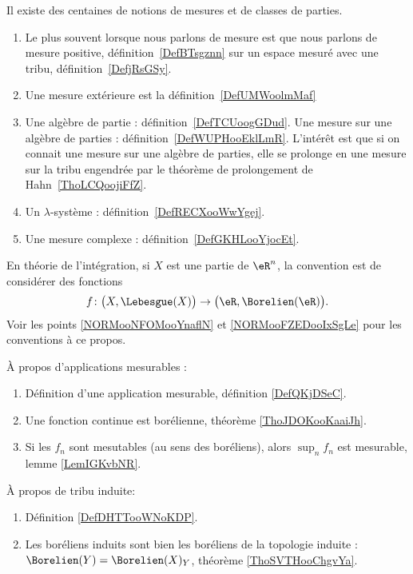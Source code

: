 

  \label{INTooVDSCooHXLLKp}
Il existe des centaines de notions de mesures et de classes de parties.
\begin{enumerate}
	\item
	      Le plus souvent lorsque nous parlons de mesure est que nous parlons de mesure positive, définition~\ref{DefBTsgznn} sur un espace mesuré avec une tribu, définition~\ref{DefjRsGSy}.
	\item
	      Une mesure extérieure est la définition~\ref{DefUMWoolmMaf}
	\item
	      Une algèbre de partie : définition~\ref{DefTCUoogGDud}. Une mesure sur une algèbre de parties : définition~\ref{DefWUPHooEklLmR}. L'intérêt est que si on connait une mesure sur une algèbre de parties, elle se prolonge en une mesure sur la tribu engendrée par le théorème de prolongement de Hahn~\ref{ThoLCQoojiFfZ}.
	\item
	      Un \( \lambda\)-système : définition~\ref{DefRECXooWwYgej}.
	\item
	      Une mesure complexe : définition~\ref{DefGKHLooYjocEt}.
\end{enumerate}

En théorie de l'intégration, si \( X\) est une partie de \( \eR^n\), la convention est de considérer des fonctions
\begin{equation*}
	f\colon \big( X,\Lebesgue(X) \big)\to \big( \eR,\Borelien(\eR) \big).
\end{equation*}
Voir les points \ref{NORMooNFOMooYnaflN} et \ref{NORMooFZEDooIxSgLe} pour les conventions à ce propos.

À propos d'applications mesurables :
\begin{enumerate}
	\item
	      Définition d'une application mesurable, définition \ref{DefQKjDSeC}.
	\item
	      Une fonction continue est borélienne, théorème \ref{ThoJDOKooKaaiJh}.
      \item
          Si les \( f_n\) sont mesutables (au sens des boréliens), alors \( \sup_nf_n\) est mesurable, lemme \ref{LemIGKvbNR}.
\end{enumerate}


À propos de tribu induite:
\begin{enumerate}
	\item
	      Définition \ref{DefDHTTooWNoKDP}.
	\item
	      Les boréliens induits sont bien les boréliens de la topologie induite : \( \Borelien(Y)=\Borelien(X)_Y\), théorème \ref{ThoSVTHooChgvYa}.
\end{enumerate}
